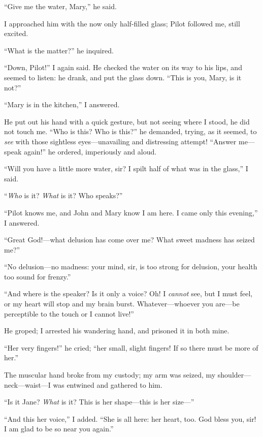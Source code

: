 \enquote{Give me the water, Mary,} he said.

I approached him with the now only half-filled glass; Pilot followed me,
still excited.

\enquote{What is the matter?} he inquired.

\enquote{Down, Pilot!} I again said. He checked the water on its way to
his lips, and seemed to listen: he drank, and put the glass down.
\enquote{This is you, Mary, is it not?}

\enquote{Mary is in the kitchen,} I answered.

He put out his hand with a quick gesture, but not seeing where I stood,
he did not touch me. \enquote{Who is this? Who is this?} he demanded,
trying, as it seemed, to \emph{see} with those sightless
eyes---unavailing and distressing attempt! \enquote{Answer me---speak
	again!} he ordered, imperiously and aloud.

\enquote{Will you have a little more water, sir? I spilt half of what
	was in the glass,} I said.

\enquote{\emph{Who} is it? \emph{What} is it? Who speaks?}

\enquote{Pilot knows me, and John and Mary know I am here. I came only
	this evening,} I answered.

\enquote{Great God!---what delusion has come over me? What sweet
	madness has seized me?}

\enquote{No delusion---no madness: your mind, sir, is too strong for
	delusion, your health too sound for frenzy.}

\enquote{And where is the speaker? Is it only a voice? Oh! I \emph{cannot}
	see, but I must feel, or my heart will stop and my brain burst.
	Whatever---whoever you are---be perceptible to the touch or I cannot
	live!}

He groped; I arrested his wandering hand, and prisoned it in both mine.

\enquote{Her very fingers!} he cried; \enquote{her small, slight
	fingers! If so there must be more of her.}

The muscular hand broke from my custody; my arm was seized, my
shoulder---neck---waist---I was entwined and gathered to him.

\enquote{Is it Jane? \emph{What} is it? This is her shape---this is her
	size---}

\enquote{And this her voice,} I added. \enquote{She is all here: her
	heart, too. God bless you, sir! I am glad to be so near you again.}

